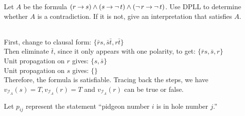 \documentclass[]{exam}
\begin{document}
\begin{questions}
\begin{solution}
\end{solution}
\question Let $A$ be the formula $(r \mathbin{\rightarrow} s) \land (s \mathbin{\rightarrow} \mathop{\neg} t) \land (\mathop{\neg} r \mathbin{\rightarrow} \mathop{\neg} t)$.
Use DPLL to determine whether $A$ is a contradiction. If it is not, give an
interpretation that satisfies $A$.
\begin{solution}
~\\
First, change to clausal form: $\{\bar{r}s,\bar{s}\bar{t},r\bar{t}\}$\\
Then eliminate $\bar{t}$, since it only appears with one polarity, to get: $\{\bar{r}s,\bar{s},r\}$\\
Unit propagation on $r$ gives: $\{s,\bar{s}\}$\\
Unit propagation on $s$ gives: $\{\}$\\
Therefore, the formula is satisfiable. Tracing back the steps, we have
$v_{\mathcal{I}_A}(s) = T, v_{\mathcal{I}_A}(r) = T$ and $v_{\mathcal{I}_A}(r)$
can be true or false.
\end{solution}

\question Let $p_{ij}$ represent the statement ``pidgeon number $i$ is in hole number $j$.''
\end{questions}
\end{document}
